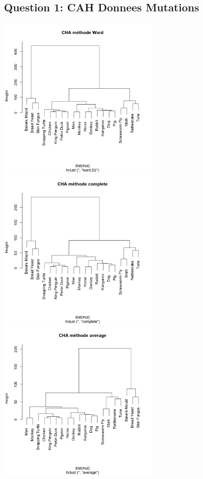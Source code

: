 \documentclass[10pt]{article}
\begin{document}
	\subsection{Question 1: CAH Donnees Mutations}
	\includegraphics[height = 8cm, width = 8cm]{Figures/HClust/hclust_Mutations_ward.png}
	\includegraphics[height = 8cm, width = 8cm]{Figures/HClust/hclust_Mutations_cplt.png}\\
	\includegraphics[height = 8cm, width = 8cm]{Figures/HClust/hclust_Mutations_avg.png}
\end{document}
